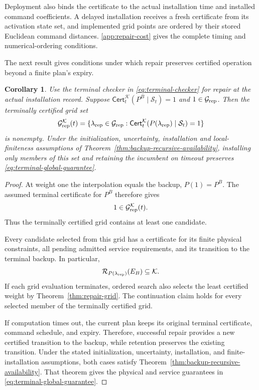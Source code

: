 \documentclass[preprint,12pt]{elsarticle}
\newtheorem{corollary}{Corollary}
\newcommand{\appref}[1]{\ref{#1}}
\begin{document}
Deployment also binds the certificate to the actual installation time and
installed command coefficients. A delayed installation receives a fresh
certificate from its activation state set, and implemented grid points are
ordered by their stored Euclidean command distances. \appref{app:repair-cost}
gives the complete timing and numerical-ordering conditions.

The next result gives conditions under which repair preserves certified operation beyond a finite plan's expiry.

\begin{corollary}
\label{cor:repair-recursive}
Use the terminal checker in \eqref{eq:terminal-checker} for repair
at the actual installation record. Suppose
$\mathsf{Cert}^{\mathcal K}_t(P^B\mid\mathcal S_t)=1$ and
$1\in\mathcal G_{\rm rep}$. Then the terminally certified grid set
\begin{equation}
\mathcal G_{\rm rep}^{\mathcal K}(t)=
\{\lambda_{\rm rep}\in\mathcal G_{\rm rep}:
\mathsf{Cert}^{\mathcal K}_t(P(\lambda_{\rm rep})\mid\mathcal S_t)=1\}
\label{eq:repair-terminal-grid}
\end{equation}
is nonempty. Under the initialization, uncertainty, installation and
local-finiteness assumptions of
Theorem~\ref{thm:backup-recursive-availability}, installing only members
of this set and retaining the incumbent on timeout preserves
\eqref{eq:terminal-global-guarantee}.
\end{corollary}

\begin{proof}
At weight one the interpolation equals the backup, $P(1)=P^B$.
The assumed terminal certificate for $P^B$ therefore gives
\[
 1\in\mathcal G_{\rm rep}^{\mathcal K}(t).
\]
Thus the terminally certified grid contains at least one candidate.

Every candidate selected from this grid has a certificate for its finite
physical constraints, all pending admitted service requirements, and its
transition to the terminal backup. In particular,
\[
 \mathcal R_{P(\lambda_{\rm rep})}(E_B)\subseteq\mathcal K.
\]
If each grid evaluation terminates, ordered search also selects the least
certified weight by Theorem~\ref{thm:repair-grid}. The continuation claim
holds for every selected member of the terminally certified grid.

If computation times out, the current plan keeps its original terminal
certificate, command schedule, and expiry. Therefore, successful repair
provides a new certified transition to the backup, while retention
preserves the existing transition. Under the stated initialization,
uncertainty, installation, and finite-installation assumptions, both cases
satisfy Theorem~\ref{thm:backup-recursive-availability}. That theorem gives
the physical and service guarantees in
\eqref{eq:terminal-global-guarantee}.
\end{proof}
\end{document}
